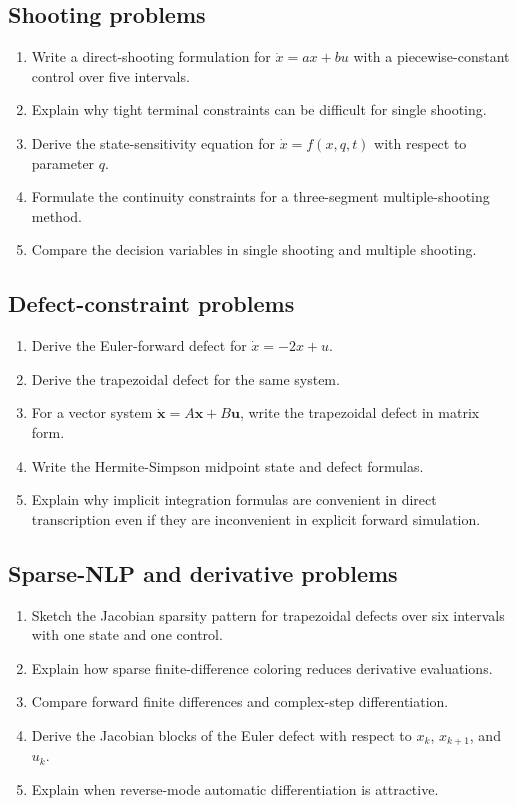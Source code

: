\documentclass[11pt]{article}
\newcommand{\vect}[1]{\boldsymbol{#1}}
\newcommand{\xstate}{\vect{x}}
\newcommand{\uvec}{\vect{u}}
\begin{document}
\subsection*{Shooting problems}
\begin{enumerate}[leftmargin=1.5em,label=\textbf{P\arabic*.},resume]
  \item Write a direct-shooting formulation for $\dot{x}=ax+bu$ with a piecewise-constant control over five intervals.
  \item Explain why tight terminal constraints can be difficult for single shooting.
  \item Derive the state-sensitivity equation for $\dot{x}=f(x,q,t)$ with respect to parameter $q$.
  \item Formulate the continuity constraints for a three-segment multiple-shooting method.
  \item Compare the decision variables in single shooting and multiple shooting.
\end{enumerate}

\subsection*{Defect-constraint problems}
\begin{enumerate}[leftmargin=1.5em,label=\textbf{P\arabic*.},resume]
  \item Derive the Euler-forward defect for $\dot{x}=-2x+u$.
  \item Derive the trapezoidal defect for the same system.
  \item For a vector system $\dot{\xstate}=A\xstate+B\uvec$, write the trapezoidal defect in matrix form.
  \item Write the Hermite-Simpson midpoint state and defect formulas.
  \item Explain why implicit integration formulas are convenient in direct transcription even if they are inconvenient in explicit forward simulation.
\end{enumerate}

\subsection*{Sparse-NLP and derivative problems}
\begin{enumerate}[leftmargin=1.5em,label=\textbf{P\arabic*.},resume]
  \item Sketch the Jacobian sparsity pattern for trapezoidal defects over six intervals with one state and one control.
  \item Explain how sparse finite-difference coloring reduces derivative evaluations.
  \item Compare forward finite differences and complex-step differentiation.
  \item Derive the Jacobian blocks of the Euler defect with respect to $x_k$, $x_{k+1}$, and $u_k$.
  \item Explain when reverse-mode automatic differentiation is attractive.
\end{enumerate}
\end{document}
